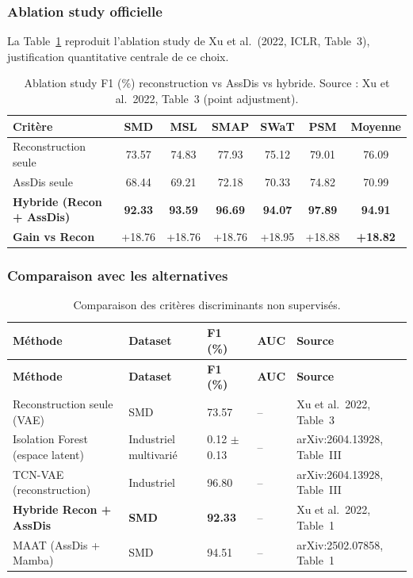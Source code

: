 \documentclass[12pt,a4paper]{article}
\newcommand{\nd}{--}
\begin{document}
\subsubsection{Ablation study officielle}

La Table~\ref{tab:d4-ablation} reproduit l'ablation study de Xu et al.\ (2022,
ICLR, Table~3), justification quantitative centrale de ce choix.

\begin{table}[ht]
\centering
\caption{Ablation study F1 (\%)  reconstruction vs AssDis vs hybride.
Source : Xu et al.\ 2022, Table~3 (point adjustment).}
\label{tab:d4-ablation}
\small
\begin{tabular}{lcccccc}
\toprule
\textbf{Critère} & \textbf{SMD} & \textbf{MSL} & \textbf{SMAP} &
\textbf{SWaT} & \textbf{PSM} & \textbf{Moyenne} \\
\midrule
Reconstruction seule & 73.57 & 74.83 & 77.93 & 75.12 & 79.01 & 76.09 \\
AssDis seule & 68.44 & 69.21 & 72.18 & 70.33 & 74.82 & 70.99 \\
\textbf{Hybride (Recon + AssDis)} &
\textbf{92.33} & \textbf{93.59} & \textbf{96.69} &
\textbf{94.07} & \textbf{97.89} & \textbf{94.91} \\
\midrule
\textbf{Gain vs Recon} &
+18.76 & +18.76 & +18.76 & +18.95 & +18.88 & \textbf{+18.82} \\
\bottomrule
\end{tabular}
\end{table}

\subsubsection{Comparaison avec les alternatives}

\begin{longtable}{p{4cm}p{2.5cm}p{2cm}p{2cm}p{4.5cm}}
\caption{Comparaison des critères discriminants non supervisés.}
\label{tab:d4-compare}\\
\toprule
\textbf{Méthode} & \textbf{Dataset} & \textbf{F1 (\%)} &
\textbf{AUC} & \textbf{Source} \\
\midrule
\endfirsthead
\toprule
\textbf{Méthode} & \textbf{Dataset} & \textbf{F1 (\%)} &
\textbf{AUC} & \textbf{Source} \\
\midrule
\endhead
\bottomrule\endlastfoot
Reconstruction seule (VAE) & SMD & 73.57 & \nd &
Xu et al.\ 2022, Table~3 \\
Isolation Forest (espace latent) & Industriel multivarié & 0.12 $\pm$ 0.13 &
\nd & arXiv:2604.13928, Table~III \\
TCN-VAE (reconstruction) & Industriel & 96.80 & \nd &
arXiv:2604.13928, Table~III \\
\textbf{Hybride Recon + AssDis} & \textbf{SMD} & \textbf{92.33} & \nd &
Xu et al.\ 2022, Table~1 \\
MAAT (AssDis + Mamba) & SMD & 94.51 & \nd &
arXiv:2502.07858, Table~1 \\
\end{longtable}
\end{document}
